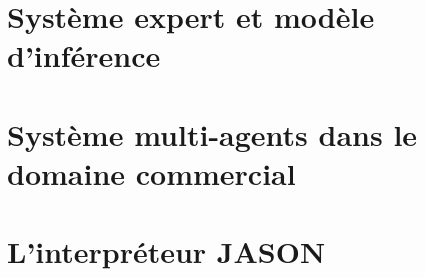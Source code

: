 \documentclass[12pt]{report}
\begin{document}
\hypersetup{hidelinks}
 
\tableofcontents

\newpage


\part{Système expert et modèle d'inférence}




\part{Système multi-agents dans le domaine commercial }




\part{L'interpréteur JASON}




\listoffigures
\listoftables
  


\end{document}
